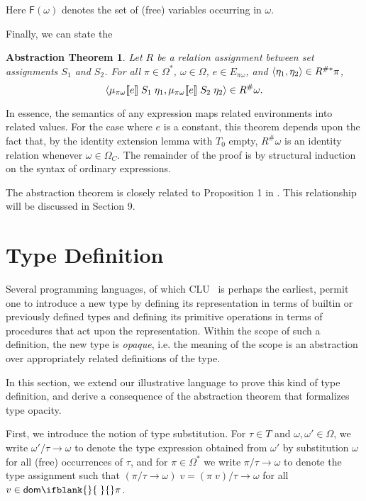 \documentclass[sigplan,screen,nonacm,balance=false]{acmart}
\makeatletter
\theoremstyle{plain}
\DeclarePairedDelimiter{\pair}{\langle}{\rangle}
\DeclarePairedDelimiter{\interp}{\llbracket}{\rrbracket}
\newcommand{\ie}{i.e.\@\xspace}
\newcommand{\dom}[1]{\mathsf{dom}\ifblank{#1}{\;}{#1}}
\newcommand{\FV}{\mathsf{F}}
\makeatother
\begin{document}
Here $\FV(\omega)$ denotes the set of (free) variables occurring in $\omega$.

Finally, we can state the

\newtheorem*{abstraction}{Abstraction Theorem}
\begin{abstraction}
  Let $R$ be a relation assignment between set assignments $S_1$ and $S_2$.
  For all $\pi \in \Omega^*$, $\omega \in \Omega$, $e \in E_{\pi \omega}$, and $\pair{\eta_1, \eta_2} \in R^{\#*} \pi$,
  \begin{equation*}
    \pair{\mu_{\pi \omega} \interp{e} \; S_1 \; \eta_1, \mu_{\pi \omega} \interp{e} \; S_2 \; \eta_2} \in R^\# \omega.
  \end{equation*}
\end{abstraction}

In essence, the semantics of any expression maps related environments into related values.
For the case where $e$ is a constant, this theorem depends upon the fact that, by the identity extension lemma with $T_0$ empty, $R^\# \omega$ is an identity relation whenever $\omega \in \Omega_C$.
The remainder of the proof is by structural induction on the syntax of ordinary expressions.

The abstraction theorem is closely related to Proposition 1 in \citep{definability}.
This relationship will be discussed in Section 9.

\section{Type Definition} \label{sec:type-def}

Several programming languages, of which CLU~\citep{CLU} is perhaps the earliest, permit one to introduce a new type by defining its representation in terms of builtin or previously defined types and defining its primitive operations in terms of procedures that act upon the representation.
Within the scope of such a definition, the new type is \emph{opaque}, \ie the meaning of the scope is an abstraction over appropriately related definitions of the type.

In this section, we extend our illustrative language to prove this kind of type definition, and derive a consequence of the abstraction theorem that formalizes type opacity.

First, we introduce the notion of type substitution.
For $\tau \in T$ and $\omega, \omega' \in \Omega$, we write $\omega'/\tau \to \omega$ to denote the type expression obtained from $\omega'$ by substitution $\omega$ for all (free) occurrences of $\tau$, and for $\pi \in \Omega^*$ we write $\pi/\tau \to \omega$ to denote the type assignment such that $(\pi/\tau \to \omega) \; v = (\pi \; v)/\tau \to \omega$ for all $v \in \dom{} \pi$.
\end{document}
